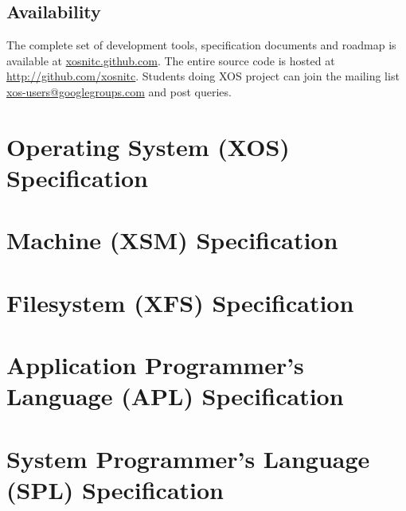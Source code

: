 \documentclass[10pt]{report}
\begin{document}
\section{Availability}
The complete set of development tools, specification documents and roadmap is available at \url{xosnitc.github.com}. The entire source code is hosted at \url{http://github.com/xosnitc}. Students doing XOS project can join the mailing list \url{xos-users@googlegroups.com} and post queries.



%
%

\begin{appendices}
\chapter{Operating System (XOS) Specification }

\chapter{Machine (XSM) Specification }

\chapter{Filesystem (XFS) Specification }

\chapter{Application Programmer's Language (APL) Specification}

\chapter{System Programmer's Language (SPL) Specification}

\end{appendices}
\end{document}
